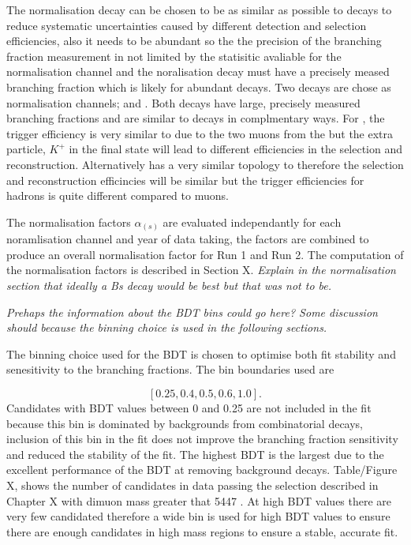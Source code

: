 The normalisation decay can be chosen to be as similar as possible to \bmumu decays to reduce systematic uncertainties caused by different detection and selection efficiencies, also it needs to be abundant so the the precision of the branching fraction measurement in not limited by the statisitic avaliable for the normalisation channel and the noralisation decay must have a precisely meased branching fraction which is likely for abundant decays. Two decays are chose as normalisation channels; \bujpsik and \bdkpi. Both decays have large, precisely measured branching fractions and are similar to \bmumu decays in complmentary ways. For \bujpsik, the trigger efficiency is very similar to \bmumu due to the two muons from the \jpsi but the extra particle, $K^{+}$ in the final state will lead to different efficiencies in the selection and reconstruction. Alternatively \bdkpi has a very similar topology to \bmumu therefore the selection and reconstruction efficincies will be similar but the trigger efficiencies for hadrons is quite different compared to muons.  

The normalisation factors $\alpha_{(s)}$ are evaluated independantly for each noramlisation channel and year of data taking, the factors are combined to produce an overall normalisation factor for Run 1 and Run 2. The computation of the normalisation factors is described in Section X. 
{\it Explain in the normalisation section that ideally a Bs decay would be best but that was not to be.}

{\it Prehaps the information about the BDT bins could go here? Some discussion should because the binning choice is used in the following sections.}

The binning choice used for the BDT is chosen to optimise both fit stability and senesitivity to the \bmumu branching fractions. The bin boundaries used are

\begin{equation}

[0.25, 0.4, 0.5, 0.6, 1.0].

\end{equation}
Candidates with BDT values between 0 and 0.25 are not included in the fit because this bin is dominated by backgrounds from combinatorial decays, inclusion of this bin in the fit does not improve the branching fraction sensitivity and reduced the stability of the fit. The highest BDT is the largest due to the excellent performance of the BDT at removing background decays. Table/Figure X, shows the number of \bmumu candidates in data passing the selection described in Chapter X with dimuon mass greater that 5447 \mevcc. At high BDT values there are very few candidated therefore a wide bin is used for high BDT values to ensure there are enough candidates in high mass regions to ensure a stable, accurate fit.


